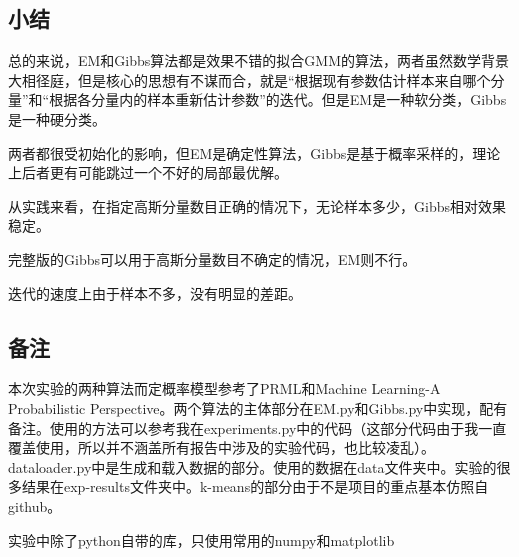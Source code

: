 \documentclass[hyperref,UTF8]{ctexart}
\begin{document}
\subsection*{小结}
\par 总的来说，EM和Gibbs算法都是效果不错的拟合GMM的算法，两者虽然数学背景大相径庭，但是核心的思想有不谋而合，就是“根据现有参数估计样本来自哪个分量”和“根据各分量内的样本重新估计参数”的迭代。但是EM是一种软分类，Gibbs是一种硬分类。
\par 两者都很受初始化的影响，但EM是确定性算法，Gibbs是基于概率采样的，理论上后者更有可能跳过一个不好的局部最优解。
\par 从实践来看，在指定高斯分量数目正确的情况下，无论样本多少，Gibbs相对效果稳定。
\par 完整版的Gibbs可以用于高斯分量数目不确定的情况，EM则不行。
\par 迭代的速度上由于样本不多，没有明显的差距。


\subsection*{备注}
\par 本次实验的两种算法而定概率模型参考了PRML和Machine Learning-A Probabilistic Perspective。两个算法的主体部分在EM.py和Gibbs.py中实现，配有备注。使用的方法可以参考我在experiments.py中的代码（这部分代码由于我一直覆盖使用，所以并不涵盖所有报告中涉及的实验代码，也比较凌乱）。dataloader.py中是生成和载入数据的部分。使用的数据在data文件夹中。实验的很多结果在exp-results文件夹中。k-means的部分由于不是项目的重点基本仿照自github。
\par 实验中除了python自带的库，只使用常用的numpy和matplotlib





\end{document}
